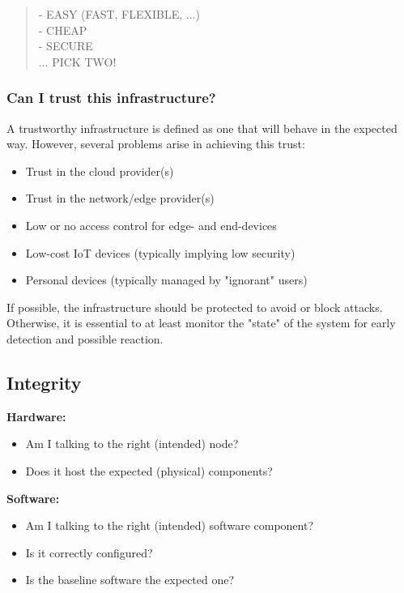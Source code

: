 \begin{quote}
- EASY (FAST, FLEXIBLE, ...) \\
- CHEAP \\
- SECURE \\
... PICK TWO!
\end{quote}

\subsubsection{Can I trust this infrastructure?}
A trustworthy infrastructure is defined as one that will behave in the expected way. However, several problems arise in achieving this trust:

\begin{itemize}[itemsep=0pt]
    \item Trust in the cloud provider(s)
    \item Trust in the network/edge provider(s)
    \item Low or no access control for edge- and end-devices
    \item Low-cost IoT devices (typically implying low security)
    \item Personal devices (typically managed by "ignorant" users)
\end{itemize}

If possible, the infrastructure should be protected to avoid or block attacks. Otherwise, it is essential to at least monitor the "state" of the system for early detection and possible reaction.

\subsection{Integrity}
\textbf{Hardware:}
\begin{itemize}[itemsep=0pt]
    \item Am I talking to the right (intended) node?
    \item Does it host the expected (physical) components?
\end{itemize}

\textbf{Software:}
\begin{itemize}[itemsep=0pt]
    \item Am I talking to the right (intended) software component?
    \item Is it correctly configured?
    \item Is the baseline software the expected one?
\end{itemize}

